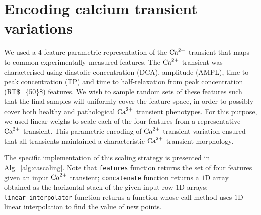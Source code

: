 \section{Encoding calcium transient variations}\label{sec:ch6encodingcalciumtransientvariations}
We used a $4$-feature parametric representation of the $\textrm{Ca}^{2+}$ transient that maps to common experimentally measured features. The $\textrm{Ca}^{2+}$ transient was characterised using diastolic concentration (\acs{DCA}), amplitude (\acs{AMPL}), time to peak concentration (\acs{TP}) and time to half-relaxation from peak concentration (\acs{RT$_{50}$}) features. We wish to sample random sets of these features such that the final samples will uniformly cover the feature space, in order to possibly cover both healthy and pathological $\textrm{Ca}^{2+}$ transient phenotypes. For this purpose, we used linear weighs to scale each of the four features from a representative $\textrm{Ca}^{2+}$ transient. This parametric encoding of $\textrm{Ca}^{2+}$ transient variation ensured that all transients maintained a characteristic $\textrm{Ca}^{2+}$ transient morphology. 

\vspace{0.2cm}
The specific implementation of this scaling strategy is presented in Alg.~\ref{alg:cascaling}. Note that \texttt{features} function returns the set of four features given an input $\textrm{Ca}^{2+}$ transient; \texttt{concatenate} function returns a $1$D array obtained as the horizontal stack of the given input row $1$D arrays; \texttt{linear\_interpolator} function returns a function whose call method uses $1$D linear interpolation to find the value of new points.

